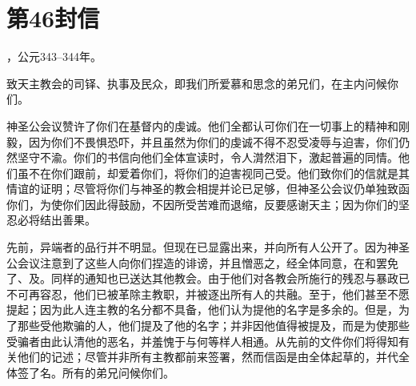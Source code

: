 \section{第46封信}

，公元343--344年。\par

致天主教会的司铎、执事及民众，即我们所爱慕和思念的弟兄们，在主内问候你们。\par

神圣公会议赞许了你们在基督内的虔诚。他们全都认可你们在一切事上的精神和刚毅，因为你们不畏惧恐吓，并且虽然为你们的虔诚不得不忍受凌辱与迫害，你们仍然坚守不渝。你们的书信向他们全体宣读时，令人潸然泪下，激起普遍的同情。他们虽不在你们跟前，却爱着你们，将你们的迫害视同己受。他们致你们的信就是其情谊的证明；尽管将你们与神圣的教会相提并论已足够，但神圣公会议仍单独致函你们，为使你们因此得鼓励，不因所受苦难而退缩，反要感谢天主；因为你们的坚忍必将结出善果。\par

先前，异端者的品行并不明显。但现在已显露出来，并向所有人公开了。因为神圣公会议注意到了这些人向你们捏造的诽谤，并且憎恶之，经全体同意，在和罢免了、及。同样的通知也已送达其他教会。由于他们对各教会所施行的残忍与暴政已不可再容忍，他们已被革除主教职，并被逐出所有人的共融。至于，他们甚至不愿提起；因为此人连主教的名分都不具备，他们认为提他的名字是多余的。但是，为了那些受他欺骗的人，他们提及了他的名字；并非因他值得被提及，而是为使那些受骗者由此认清他的恶名，并羞愧于与何等样人相通。从先前的文件你们将得知有关他们的记述；尽管并非所有主教都前来签署，然而信函是由全体起草的，并代全体签了名。所有的弟兄问候你们。\par

\par

